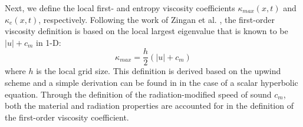 \documentclass[review]{elsarticle}
\begin{document}
Next, we define the local first- and entropy viscosity coefficients $\kappa_{max}(x,t)$ and $\kappa_e(x,t)$, respectively. Following the work of Zingan et al. \cite{valentin}, the first-order viscosity definition is based on the local largest eigenvalue that is known to be $|u| + c_m$ in 1-D:
\begin{equation}
\label{eq:equation8}
\kappa_{max} = \frac{h}{2} \left( |u| + c_m \right)
\end{equation}  
where $h$ is the local grid size. This definition is derived based on the upwind scheme and a simple derivation can be found in \cite{jlg1} in the case of a scalar hyperbolic equation. Through the definition of the radiation-modified speed of sound $c_m$, both the material and radiation properties are accounted for in the definition of the first-order viscosity coefficient.
\end{document}
